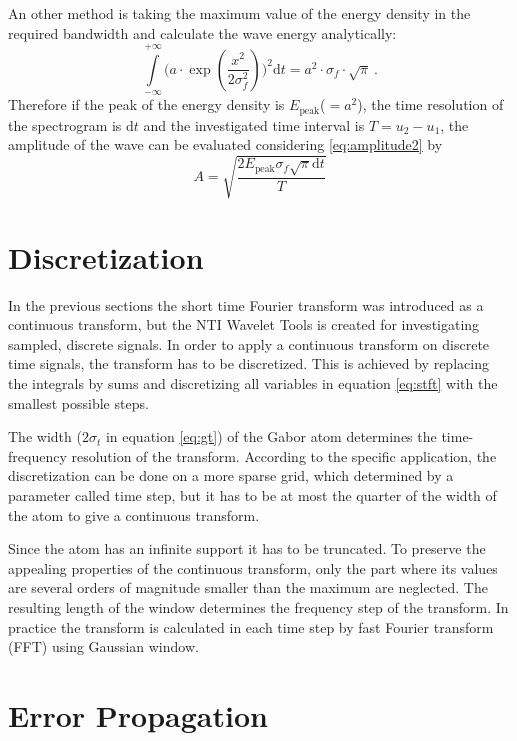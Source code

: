 \documentclass[a4paper,12pt,oneside]{article}
\newcommand{\dt}{\mathrm{d}t}
\begin{document}
An other method is taking the maximum value of the energy density in the required bandwidth and calculate the wave energy analytically:
\begin{equation}\label{eq:energy_analytical}
  \int\limits_{-\infty}^{+\infty} \Bigg( a \cdot \exp\left( \frac{x^2}{2\sigma_f^2} \right) \Bigg)^2 \dt = 
  a^2 \cdot \sigma_f \cdot \sqrt{\pi} \ .
\end{equation}
Therefore if the peak of the energy density is $E_{\textrm{peak}}$($=a^2$), the time resolution of the spectrogram is $\dt$ and the investigated time interval is $T = u_2-u_1$,  the amplitude of the wave can be evaluated considering \eqref{eq:amplitude2} by
\begin{equation}\label{amp_from_energy}
  A = \sqrt{ \frac{2 E_{\textrm{peak}} \sigma_f \sqrt{\pi} \dt}{T}}
\end{equation}

\section{Discretization}

In the previous sections the short time Fourier transform was introduced as a continuous transform, but the NTI Wavelet Tools is created for investigating sampled, discrete signals. In order to apply a continuous transform on discrete time signals, the transform has to be discretized. This is achieved by replacing the integrals by sums and discretizing all variables in equation \eqref{eq:stft} with the smallest possible steps.

The width ($2 \sigma_t$ in equation \eqref{eq:gt}) of the Gabor atom determines the time-frequency resolution of the transform. According to the specific application, the discretization can be done on a more sparse grid, which determined by a parameter called time step, but it has to be at most the quarter of the width of the atom to give a continuous transform.

Since the atom has an infinite support it has to be truncated. To preserve the appealing properties of the continuous transform, only the part where its values are several orders of magnitude smaller than the maximum are neglected. The resulting length of the window determines the frequency step of the transform. In practice the transform is calculated in each time step by fast Fourier transform (FFT) using Gaussian window.

\section{Error Propagation}
\end{document}
